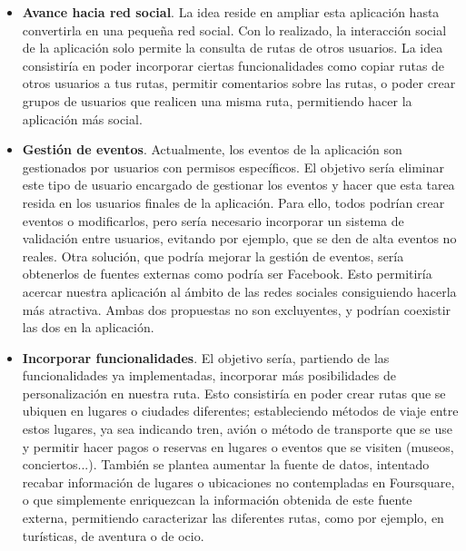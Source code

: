 \begin{itemize}
	\item \textbf{Avance hacia red social}. La idea reside en ampliar esta aplicación hasta convertirla en una pequeña red social. Con lo realizado, la interacción social de la aplicación solo permite la consulta de rutas de otros usuarios. La idea consistiría en poder incorporar ciertas funcionalidades como copiar rutas de otros usuarios a tus rutas, permitir comentarios sobre las rutas, o poder crear grupos de usuarios que realicen una misma ruta, permitiendo hacer la aplicación más social.
	
	\item \textbf{Gestión de eventos}. Actualmente, los eventos de la aplicación son gestionados por usuarios con permisos específicos. El objetivo sería eliminar este tipo de usuario encargado de gestionar los eventos y hacer que esta tarea resida en los usuarios finales de la aplicación. Para ello, todos podrían crear eventos o modificarlos, pero sería necesario incorporar un sistema de validación entre usuarios, evitando por ejemplo, que se den de alta eventos no reales. Otra solución, que podría mejorar la gestión de eventos, sería obtenerlos de fuentes externas como podría ser Facebook. Esto permitiría acercar nuestra aplicación al ámbito de las redes sociales consiguiendo hacerla más atractiva. Ambas dos propuestas no son excluyentes, y podrían coexistir las dos en la aplicación.

	\item \textbf{Incorporar funcionalidades}. El objetivo sería, partiendo de las funcionalidades ya implementadas, incorporar más posibilidades de personalización en nuestra ruta. Esto consistiría en poder crear rutas que se ubiquen en lugares o ciudades diferentes; estableciendo métodos de viaje entre estos lugares, ya sea indicando tren, avión o método de transporte que se use y permitir hacer pagos o reservas en lugares o eventos que se visiten (museos, conciertos...). También se plantea aumentar la fuente de datos, intentado recabar información de lugares o ubicaciones no contempladas en Foursquare, o que simplemente enriquezcan la información obtenida de este fuente externa, permitiendo caracterizar las diferentes rutas, como por ejemplo, en turísticas, de aventura o de ocio.

\end{itemize}












